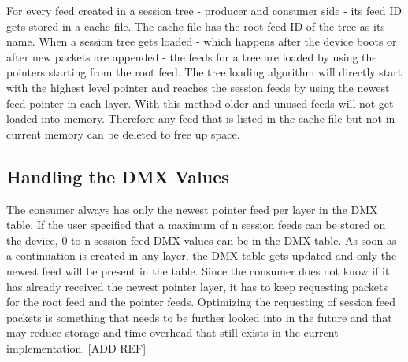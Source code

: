 For every feed created in a session tree - producer and consumer side - its feed ID gets stored in a cache file. The cache file has the root feed ID of the tree as its name. When a session tree gets loaded - which happens after the device boots or after new packets are appended - the feeds for a tree are loaded by using the pointers starting from the root feed. The tree loading algorithm will directly start with the highest level pointer and reaches the session feeds by using the newest feed pointer in each layer. With this method older and unused feeds will not get loaded into memory. Therefore any feed that is listed in the cache file but not in current memory can be deleted to free up space.


\subsection{Handling the DMX Values}
The consumer always has only the newest pointer feed per layer in the DMX table. If the user specified that a maximum of n session feeds can be stored on the device, 0 to n session feed DMX values can be in the DMX table. As soon as a continuation is created in any layer, the DMX table gets updated and only the newest feed will be present in the table. Since the consumer does not know if it has already received the newest pointer layer, it has to keep requesting packets for the root feed and the pointer feeds. Optimizing the requesting of session feed packets is something that needs to be further looked into in the future and that may reduce storage and time overhead that still exists in the current implementation. [ADD REF]

